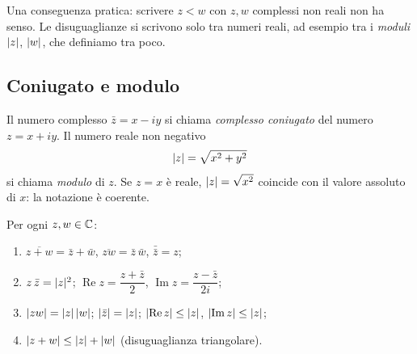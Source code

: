 \begin{attenzione}
Una conseguenza pratica: scrivere $z<w$ con $z,w$ complessi non reali non ha senso. Le
disuguaglianze si scrivono solo tra numeri reali, ad esempio tra i \emph{moduli}
$\lvert z\rvert$, $\lvert w\rvert$, che definiamo tra poco.
\end{attenzione}

\subsection{Coniugato e modulo}

\begin{definizione}
Il numero complesso $\bar z=x-iy$ si chiama \emph{complesso coniugato} del numero
$z=x+iy$. Il numero reale non negativo
\begin{equation}\label{eq:modulo-complesso}
  \lvert z\rvert=\sqrt{x^{2}+y^{2}}
\end{equation}
si chiama \emph{modulo} di $z$. Se $z=x$ è reale, $\lvert z\rvert=\sqrt{x^{2}}$ coincide con il
valore assoluto di $x$: la notazione è coerente.
\end{definizione}

\begin{proposizione}\label{prop:coniugato-modulo}
Per ogni $z,w\in\mathbb{C}$:
\begin{enumerate}
  \item $\overline{z+w}=\bar z+\bar w$, \quad $\overline{zw}=\bar z\,\bar w$, \quad
  $\bar{\bar z}=z$;
  \item $z\,\bar z=\lvert z\rvert^{2}$; \quad $\operatorname{Re}z=\dfrac{z+\bar z}{2}$, \quad
  $\operatorname{Im}z=\dfrac{z-\bar z}{2i}$;
  \item $\lvert zw\rvert=\lvert z\rvert\,\lvert w\rvert$; \quad $\lvert \bar z\rvert=\lvert z\rvert$; \quad
  $\lvert \operatorname{Re}z\rvert\le\lvert z\rvert$, \quad $\lvert \operatorname{Im}z\rvert\le\lvert z\rvert$;
  \item $\lvert z+w\rvert\le\lvert z\rvert+\lvert w\rvert$ \quad (disuguaglianza triangolare).
\end{enumerate}
\end{proposizione}

\begin{schema}
\end{schema}

